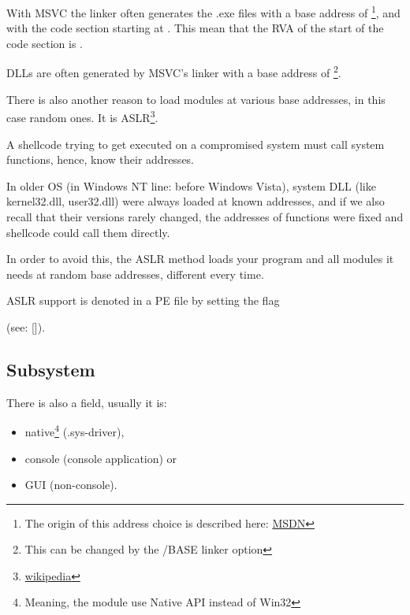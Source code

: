\par With \ac{MSVC} the linker often generates the .exe files with a base address of 
\footnote{The origin of this address choice is described here: \href{http://go.yurichev.com/17041}{MSDN}},
and with the code section starting at .
This mean that the \ac{RVA} of the start of the code section is .

DLLs are often generated by MSVC's linker with a base address of 
\footnote{This can be changed by the /BASE linker option}.


There is also another reason to load modules at various base addresses, in this case random ones.
It is \ac{ASLR}\footnote{\href{http://go.yurichev.com/17140}{wikipedia}}.


A shellcode trying to get executed on a compromised system must call system functions, hence, know their addresses.

In older \ac{OS} (in \gls{Windows NT} line: before Windows Vista),
system DLL (like kernel32.dll, user32.dll) were always loaded at known addresses, 
and if we also recall
that their versions rarely changed, the addresses of functions were
fixed and shellcode could call them directly.

In order to avoid this, the \ac{ASLR}
method loads your program and all modules it needs at random base addresses, different every time.

\ac{ASLR} support is denoted in a PE file by setting the flag
\par {} (see: [\Russinovich]).

\subsection{Subsystem}

There is also a  field, usually it is:


\begin{itemize}
\item native\footnote{Meaning, the module use Native API instead of Win32} (.sys-driver), 

\item console (console application) or

\item \ac{GUI} (non-console).
\end{itemize}

